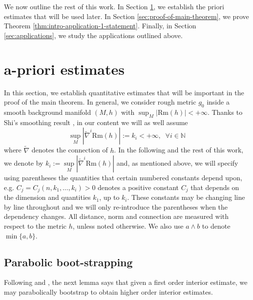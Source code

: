 \documentclass[12pt]{amsart}
\theoremstyle{plain}
\theoremstyle{plain}
\theoremstyle{definition}
\theoremstyle{remark}
\numberwithin{equation}{subsection}
\newcommand{\hdel}{\tilde{\nabla}}
\begin{document}
We now outline the rest of this work. In Section \ref{sec:a-priori-estimates}, we establish the priori estimates that will be used later. In Section \ref{sec:proof-of-main-theorem}, we prove Theorem \ref{thm:intro-application-1-statement}. Finally, in Section \ref{sec:applications}, we study the applications outlined above.




\section{a-priori estimates}\label{sec:a-priori-estimates}


In this section, we establish quantitative estimates that will be important in the proof of the main theorem. In general, we consider rough metric $g_0$ inside a smooth background manifold $(M,h)$ with $\sup_M|\mathrm{Rm}(h)|<+\infty$. Thanks to Shi's smoothing result \cite{shi_deforming_1989}, in our content we will as well assume  
\begin{equation}\label{eqn:h-remark-curvature-estimates}
  \sup\limits_{M}|\hdel^i\text{Rm}(h)|:=k_i<+\infty,\;\; \forall i\in \mathbb{N}
\end{equation}
where $\hdel$ denotes the connection of $h$. In the following and the rest of this work, we denote by $k_i := \sup\limits_M|\hdel^i\text{Rm}(h)|$ and, as mentioned above, we will specify using parentheses the quantities that certain numbered constants depend upon, e.g. $C_j = C_j(n,k_1,\dots,k_i) > 0$ denotes a positive constant $C_j$ that depends on the dimension and quantities $k_1$, up to $k_i$. These constants may be changing line by line throughout and we will only re-introduce the parentheses when the dependency changes.
All distance, norm and connection are measured with respect to the metric $h$, unless noted otherwise. We also use $a\wedge b$ to denote $\min\{a,b\}$.

\subsection{Parabolic boot-strapping}

Following \cite{shi_deforming_1989} and \cite{simon_deformation_2002}, the next lemma says that given a first order interior estimate, we may parabolically bootstrap to obtain higher order interior estimates.
\end{document}
